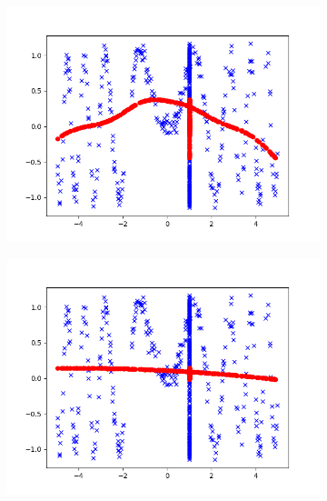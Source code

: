\begin{answer}
\begin{figure}[htb]
    \begin{subfigure}{0.5\linewidth}
        \centering
        \includegraphics[width=\linewidth]{tex/tau_1.0.png}
    \end{subfigure}
    \begin{subfigure}{0.5\linewidth}
        \centering
        \includegraphics[width=\linewidth]{tex/tau_10.0.png}
    \end{subfigure}
\end{figure}
\end{answer}
